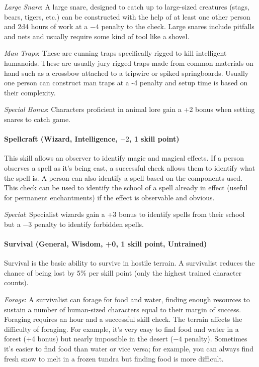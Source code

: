 \begin{multicols}{2}
\textit{Large Snare}: A large snare, designed to catch up to large-sized creatures (stags, bears, tigers, etc.) can be constructed with the help of at least one other person and 2d4 hours of work at a $-4$ penalty to the check.  Large snares include pitfalls and nets and usually require some kind of tool like a shovel.

\textit{Man Traps}: These are cunning traps specifically rigged to kill intelligent humanoids.  These are usually jury rigged traps made from common materials on hand such as a crossbow attached to a tripwire or spiked springboards.  Usually one person can construct man traps at a -4 penalty and setup time is based on their complexity.

\textit{Special Bonus}: Characters proficient in animal lore gain a +2 bonus when setting snares to catch game.

\paragraph{Spellcraft (Wizard, Intelligence, $-2$, 1 skill point)}

This skill allows an observer to identify magic and magical effects.  If a person observes a spell as it's being cast, a successful check allows them to identify what the spell is.  A person can also identify a spell based on the components used.  This check can be used to identify the school of a spell already in effect (useful for permanent enchantments) if the effect is observable and obvious.  

\textit{Special}: Specialist wizards gain a +3 bonus to identify spells from their school but a $-3$ penalty to identify forbidden spells.

\paragraph{Survival (General, Wisdom, +0, 1 skill point, Untrained)}

Survival is the basic ability to survive in hostile terrain.  A survivalist reduces the chance of being lost by 5\% per skill point (only the highest trained character counts).  

\textit{Forage}: A survivalist can forage for food and water, finding enough resources to sustain a number of human-sized characters equal to their margin of success.  Foraging requires an hour and a successful skill check.  The terrain affects the difficulty of foraging.  For example, it's very easy to find food and water in a forest (+4 bonus) but nearly impossible in the desert ($-4$ penalty).  Sometimes it's easier to find food than water or vice versa; for example, you can always find fresh snow to melt in a frozen tundra but finding food is more difficult.


\end{multicols}
